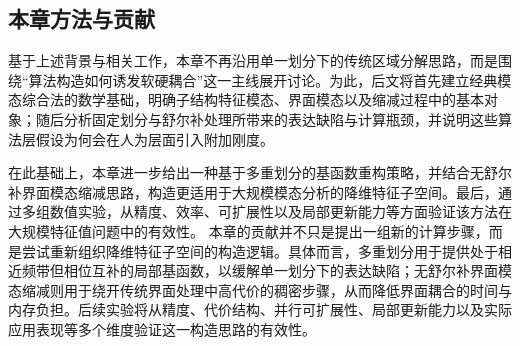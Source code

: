 \subsection{本章方法与贡献}

基于上述背景与相关工作，本章不再沿用单一划分下的传统区域分解思路，而是围绕“算法构造如何诱发软硬耦合”这一主线展开讨论。为此，后文将首先建立经典模态综合法的数学基础，明确子结构特征模态、界面模态以及缩减过程中的基本对象；随后分析固定划分与舒尔补处理所带来的表达缺陷与计算瓶颈，并说明这些算法层假设为何会在人为层面引入附加刚度。

在此基础上，本章进一步给出一种基于多重划分的基函数重构策略，并结合无舒尔补界面模态缩减思路，构造更适用于大规模模态分析的降维特征子空间。最后，通过多组数值实验，从精度、效率、可扩展性以及局部更新能力等方面验证该方法在大规模特征值问题中的有效性。
本章的贡献并不只是提出一组新的计算步骤，而是尝试重新组织降维特征子空间的构造逻辑。具体而言，多重划分用于提供处于相近频带但相位互补的局部基函数，以缓解单一划分下的表达缺陷；无舒尔补界面模态缩减则用于绕开传统界面处理中高代价的稠密步骤，从而降低界面耦合的时间与内存负担。后续实验将从精度、代价结构、并行可扩展性、局部更新能力以及实际应用表现等多个维度验证这一构造思路的有效性。
